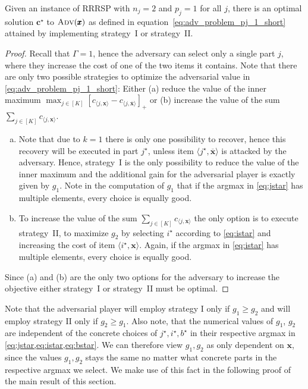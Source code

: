 \begin{lemma}
\label{lemma:strategy}
Given an instance of RRRSP with $n_j = 2$ and $p_j = 1$ for all $j$, 
there is an optimal solution $\pmb{c}^\star$ to $\textsc{Adv}(\pmb{x})$ 
as defined in equation~\eqref{eq:adv_problem_pj_1_short}
attained by implementing strategy~I or strategy~II.
\end{lemma}
\begin{proof}
Recall that $\Gamma=1$, hence the adversary can select only a single part $j$, where they increase the cost of one of the two items it contains. Note that there are only two possible strategies to optimize the adversarial value in \cref{eq:adv_problem_pj_1_short}:
Either (a) reduce the value of the inner maximum $\max_{j\in[K]} [c_{\langle j, \pmb{x} \rangle} - c_{\langle j, \overline{\pmb{x}} \rangle}]_+$
or (b) increase the value of the sum $\sum_{j\in[K]} c_{\langle j, \pmb{x} \rangle}$.
\begin{enumerate}[(a)]

  \item Note that due to $k=1$ there is only one possibility to recover, hence 
    this recovery will be executed in part $j^\star$, unless item $\langle j^\star,\overline{\pmb{x}}\rangle$ is 
    attacked by the adversary. Hence, strategy~I is the only possibility to reduce the value 
    of the inner maximum and the additional gain for the adversarial player is exactly given by $g_1$.
    Note in the computation of $g_1$ that if the argmax in \cref{eq:jstar} has multiple elements, every choice is equally good.

  \item To increase the value of the sum $\sum_{j\in[K]} c_{\langle j, \pmb{x} \rangle}$ the only 
    option is to execute strategy~II, to maximize $g_2$ by selecting $i^\star$ according to \cref{eq:istar}
    and increasing the cost of  item $\langle i^\star,\pmb{x}\rangle$. Again, if the argmax in \cref{eq:istar} has multiple elements, every choice is equally good.
\end{enumerate}
Since (a) and (b) are the only two options for the adversary to increase 
the objective either strategy~I or strategy~II must be optimal.
\end{proof}

Note that the adversarial player will employ strategy I only if $g_1 \geq g_2$ and will employ strategy II only if $g_2\geq g_1$. Also note, that the numerical values of $g_1$, $g_2$ are independent of the concrete choices of $j^\star, i^\star, b^\star$ in their respective argmax in \cref{eq:jstar,eq:istar,eq:bstar}. We can therefore view $g_1, g_2$ as only dependent on $\pmb x$, since the values $g_1, g_2$ stays the same no matter what concrete parts in the respective argmax we select.
We make use of this fact in the following proof of the main result of this section.


